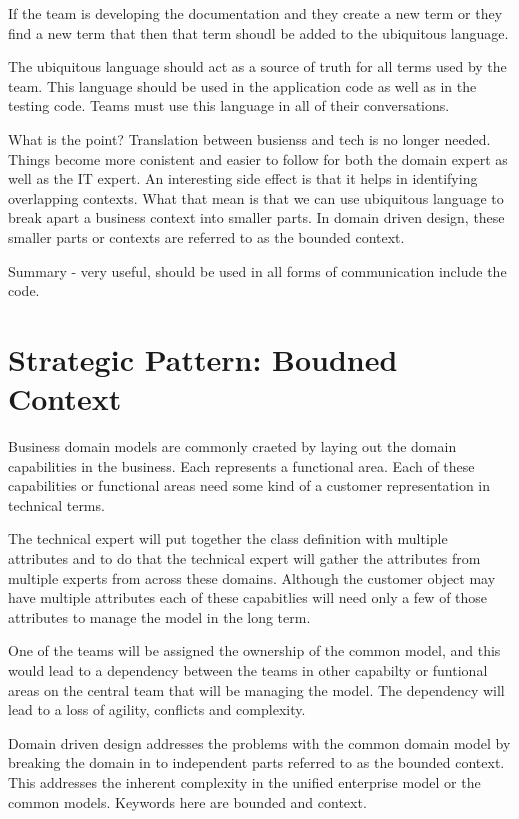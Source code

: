 \documentclass[a4paper, 11pt]{book}
\begin{document}
    If the team is developing the documentation and they create a new term or they find a new term that then that term shoudl be added to the ubiquitous language.

    The ubiquitous language should act as a source of truth for all terms used by the team.
    This language should be used in the application code as well as in the testing code.
    Teams must use this language in all of their conversations.

    What is the point?
    Translation between busienss and tech is no longer needed.
    Things become more conistent and easier to follow for both the domain expert as well as the IT expert.
    An interesting side effect is that it helps in identifying overlapping contexts.
    What that mean is that we can use ubiquitous language to break apart a business context into smaller parts.
    In domain driven design, these smaller parts or contexts are referred to as the bounded context.

    Summary - very useful, should be used in all forms of communication include the code.

    \section{Strategic Pattern: Boudned Context}
    Business domain models are commonly craeted by laying out the domain capabilities in the business.
    Each represents a functional area.
    Each of these capabilities or functional areas need some kind of a customer representation in technical terms.

    The technical expert will put together the class definition with multiple attributes and to do that the technical expert will gather the attributes from multiple experts from across these domains.
    Although the customer object may have multiple attributes each of these capabitlies will need only a few of those attributes to manage the model in the long term.

    One of the teams will be assigned the ownership of the common model, and this would lead to a dependency between the teams in other capabilty or funtional areas on the central team that will be managing the model.
    The dependency will lead to a loss of agility, conflicts and complexity.

    Domain driven design addresses the problems with the common domain model by breaking the domain in to independent parts referred to as the bounded context.
    This addresses the inherent complexity in the unified enterprise model or the common models.
    Keywords here are bounded and context.
\end{document}

